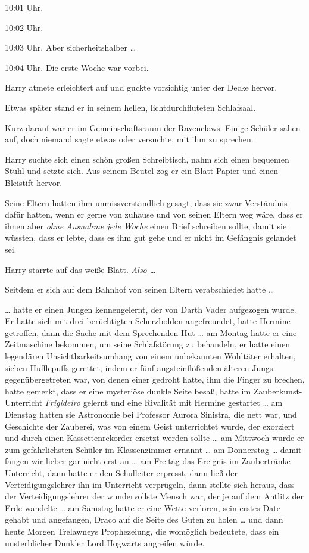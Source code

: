 {10:01 Uhr.

10:02 Uhr.

10:03 Uhr. Aber sicherheitshalber …

10:04 Uhr. Die erste Woche war vorbei.

Harry atmete erleichtert auf und guckte vorsichtig unter der Decke hervor.

Etwas später stand er in seinem hellen, lichtdurchfluteten Schlafsaal.

Kurz darauf war er im Gemeinschaftsraum der Ravenclaws. Einige Schüler sahen auf, doch niemand sagte etwas oder versuchte, mit ihm zu sprechen.

Harry suchte sich einen schön großen Schreibtisch, nahm sich einen bequemen Stuhl und setzte sich. Aus seinem Beutel zog er ein Blatt Papier und einen Bleistift hervor.

Seine Eltern hatten ihm unmissverständlich gesagt, dass sie zwar Verständnis dafür hatten, wenn er gerne von zuhause und von seinen Eltern weg wäre, dass er ihnen aber \emph{ohne Ausnahme jede Woche} einen Brief schreiben sollte, damit sie wüssten, dass er lebte, dass es ihm gut gehe und er nicht im Gefängnis gelandet sei.

Harry starrte auf das weiße Blatt. \emph{Also …}

Seitdem er sich auf dem Bahnhof von seinen Eltern verabschiedet hatte …

… hatte er einen Jungen kennengelernt, der von Darth Vader aufgezogen wurde. Er hatte sich mit drei berüchtigten Scherzbolden angefreundet, hatte Hermine getroffen, dann die Sache mit dem Sprechenden Hut … am Montag hatte er eine Zeitmaschine bekommen, um seine Schlafstörung zu behandeln, er hatte einen legendären Unsichtbarkeitsumhang von einem unbekannten Wohltäter erhalten, sieben Hufflepuffs gerettet, indem er fünf angsteinflößenden älteren Jungs gegenübergetreten war, von denen einer gedroht hatte, ihm die Finger zu brechen, hatte gemerkt, dass er eine mysteriöse dunkle Seite besaß, hatte im Zauberkunst-Unterricht \emph{Frigideiro} gelernt und eine Rivalität mit Hermine gestartet … am Dienstag hatten sie Astronomie bei Professor Aurora Sinistra, die nett war, und Geschichte der Zauberei, was von einem Geist unterrichtet wurde, der exorziert und durch einen Kassettenrekorder ersetzt werden sollte … am Mittwoch wurde er zum gefährlichsten Schüler im Klassenzimmer ernannt … am Donnerstag … damit fangen wir lieber gar nicht erst an … am Freitag das Ereignis im Zaubertränke-Unterricht, dann hatte er den Schulleiter erpresst, dann ließ der Verteidigungslehrer ihn im Unterricht verprügeln, dann stellte sich heraus, dass der Verteidigungslehrer der wundervollste Mensch war, der je auf dem Antlitz der Erde wandelte … am Samstag hatte er eine Wette verloren, sein erstes Date gehabt und angefangen, Draco auf die Seite des Guten zu holen … und dann heute Morgen Trelawneys Prophezeiung, die womöglich bedeutete, dass ein unsterblicher Dunkler Lord Hogwarts angreifen würde.

}
